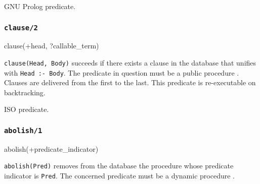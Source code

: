 \Portability

GNU Prolog predicate.

\subsubsection{\texttt{clause/2}}

\begin{TemplatesOneCol}
clause(+head, ?callable\_term)

\end{TemplatesOneCol}

\Description

\texttt{clause(Head, Body)} succeeds if there exists a clause in the
database that unifies with \texttt{Head :- Body}. The predicate in question
must be a public procedure . Clauses are delivered from the first to the last. This
predicate is re-executable on backtracking. 

\begin{PlErrors}





\end{PlErrors}

\Portability

ISO predicate.

\subsubsection{\texttt{abolish/1}}
\label{abolish/1}

\begin{TemplatesOneCol}
abolish(+predicate\_indicator)

\end{TemplatesOneCol}

\Description

\texttt{abolish(Pred)} removes from the database the procedure whose
predicate indicator is \texttt{Pred}. The concerned predicate must be a
dynamic procedure .

